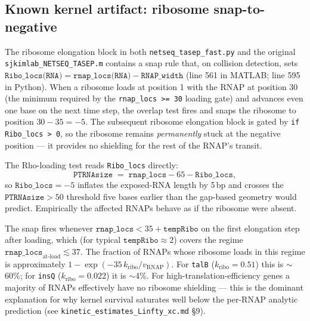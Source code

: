 \documentclass[11pt]{article}
\begin{document}
\subsection{Known kernel artifact: ribosome snap-to-negative}
\label{sec:snap-artifact}

The ribosome elongation block in both \texttt{netseq\_tasep\_fast.py}
and the original \texttt{sjkimlab\_NETSEQ\_TASEP.m} contains a snap
rule that, on collision detection, sets
$\texttt{Ribo\_locs(RNA)} = \texttt{rnap\_locs(RNA)} - \texttt{RNAP\_width}$
(line 561 in MATLAB; line 595 in Python). When a ribosome loads at
position 1 with the RNAP at position 30 (the minimum required by the
\texttt{rnap\_locs >= 30} loading gate) and advances even one base on
the next time step, the overlap test fires and snaps the ribosome to
position $30 - 35 = -5$. The subsequent ribosome elongation block is
gated by \texttt{if Ribo\_locs > 0}, so the ribosome remains
\emph{permanently} stuck at the negative position --- it provides
no shielding for the rest of the RNAP's transit.

The Rho-loading test reads \texttt{Ribo\_locs} directly:
\begin{equation*}
  \texttt{PTRNAsize} \;=\; \texttt{rnap\_locs} - 65 - \texttt{Ribo\_locs},
\end{equation*}
so $\texttt{Ribo\_locs} = -5$ inflates the exposed-RNA length by 5\,bp
and crosses the $\texttt{PTRNAsize} > 50$ threshold five bases earlier
than the gap-based geometry would predict. Empirically the affected
RNAPs behave as if the ribosome were absent.

The snap fires whenever $\texttt{rnap\_locs} < 35 + \texttt{tempRibo}$
on the first elongation step after loading, which (for typical
$\texttt{tempRibo} \approx 2$) covers the regime
$\texttt{rnap\_locs}_{\text{at-load}} \lesssim 37$. The fraction of
RNAPs whose ribosome loads in this regime is approximately
$1 - \exp(-35\, k_{\text{ribo}} / v_{\text{RNAP}})$. For
\texttt{talB} ($k_{\text{ribo}} = 0.51$) this is $\sim$60\%; for
\texttt{insQ} ($k_{\text{ribo}} = 0.022$) it is $\sim$4\%. For
high-translation-efficiency genes a majority of RNAPs effectively
have no ribosome shielding --- this is the dominant explanation for
why kernel survival saturates well below the per-RNAP analytic
prediction (see \texttt{kinetic\_estimates\_Linfty\_xc.md} \S 9).
\end{document}
